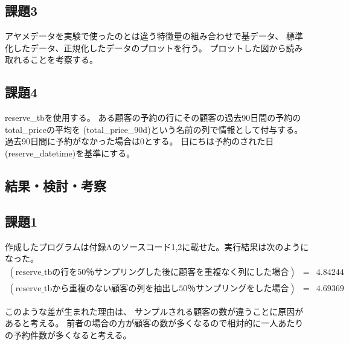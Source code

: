 \documentclass[12pt]{jarticle}
\begin{document}
\subsection{課題3}
アヤメデータを実験で使ったのとは違う特徴量の組み合わせで基データ、
標準化したデータ、正規化したデータのプロットを行う。
プロットした図から読み取れることを考察する。

\subsection{課題4}
reserve\_tbを使用する。
ある顧客の予約の行にその顧客の過去90日間の予約のtotal\_priceの平均を
(total\_price\_90d)という名前の列で情報として付与する。
過去90日間に予約がなかった場合は0とする。
日にちは予約のされた日(reserve\_datetime)を基準にする。

\clearpage

\subsection{結果・検討・考察}
\subsection{課題1}
作成したプログラムは付録Aのソースコード1,2に載せた。実行結果は次のようになった。
\begin{eqnarray}
    (\text{reserve\_tb}の行を50％サンプリングした後に顧客を重複なく列にした場合)&=& 4.84244 \nonumber \\
    (\text{reserve\_tb}から重複のない顧客の列を抽出し50％サンプリングをした場合)&=& 4.69369 \nonumber
\end{eqnarray}

このような差が生まれた理由は、
サンプルされる顧客の数が違うことに原因があると考える。
前者の場合の方が顧客の数が多くなるので相対的に一人あたりの予約件数が多くなると考える。
\end{document}

